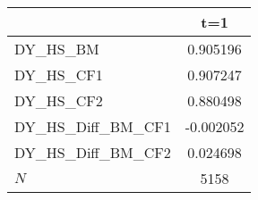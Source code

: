 {
\def\sym#1{\ifmmode^{#1}\else\(^{#1}\)\fi}
\begin{tabular}{l*{1}{c}}
\hline\hline
            &\multicolumn{1}{c}{t=1}\\
\hline
DY\_HS\_BM    &    0.905196\\
DY\_HS\_CF1   &    0.907247\\
DY\_HS\_CF2   &    0.880498\\
DY\_HS\_Diff\_BM\_CF1&   -0.002052\\
DY\_HS\_Diff\_BM\_CF2&    0.024698\\
\hline
\(N\)       &        5158\\
\hline\hline
\end{tabular}
}

